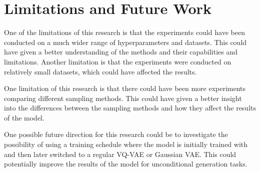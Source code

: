 \section{Limitations and Future Work}

One of the limitations of this research is that the experiments could have been conducted on a much wider range of hyperparameters and datasets. This could have given a better understanding of the methods and their capabilities and limitations. Another limitation is that the experiments were conducted on relatively small datasets, which could have affected the results.

One limitation of this research is that there could have been more experiments comparing different sampling methods. This could have given a better insight into the differences between the sampling methods and how they affect the results of the model.

One possible future direction for this research could be to investigate the possibility of using a training schedule where the model is initially trained with  and then later switched to a regular VQ-VAE or Gaussian VAE. This could potentially improve the results of the model for unconditional generation tasks.




